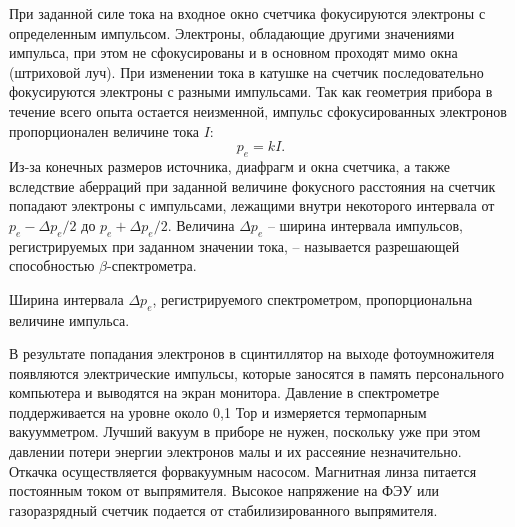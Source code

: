 \documentclass{article}
\begin{document}
	При заданной силе тока на входное окно счетчика фокусируются электроны с определенным импульсом. Электроны, обладающие другими значениями импульса, при этом не сфокусированы и в основном проходят мимо окна (штриховой луч). При изменении тока в катушке на счетчик последовательно фокусируются электроны с разными импульсами. Так как геометрия прибора в течение всего опыта остается неизменной, импульс сфокусированных электронов пропорционален величине тока $I$:
	\begin{equation}
		p_e = kI.
		\label{BetaParticles_pkI}
	\end{equation}
Из-за конечных размеров источника, диафрагм и окна счетчика, а также вследствие аберраций при заданной величине фокусного расстояния на счетчик попадают электроны с импульсами, лежащими внутри некоторого интервала от $p_e - \Delta p_e/2$ до $p_e + \Delta p_e/2$. Величина $\Delta p_e$ -- ширина интервала импульсов, регистрируемых при заданном значении тока, -- называется разрешающей способностью $\beta$-спектрометра.
	
	Ширина интервала $\Delta p_e$, регистрируемого спектрометром, пропорциональна величине импульса.
	
	В результате попадания электронов в сцинтиллятор на выходе фотоумножителя появляются электрические импульсы, которые заносятся в память персонального компьютера и выводятся на экран монитора. Давление в спектрометре поддерживается на уровне около 0,1 Тор и измеряется термопарным вакуумметром. Лучший вакуум в приборе не нужен, поскольку уже при этом давлении потери энергии электронов малы и их рассеяние незначительно. Откачка осуществляется форвакуумным насосом. Магнитная линза питается постоянным током от выпрямителя. Высокое напряжение на ФЭУ или газоразрядный счетчик подается от стабилизированного выпрямителя.
	
\end{document}
